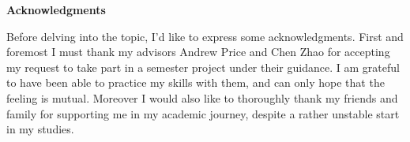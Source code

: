 \pagestyle{fancy}
\fancyhf{} %
\fancyfoot[C]{\small\thepage} %
\renewcommand{\headrulewidth}{0pt} %
\renewcommand{\footrulewidth}{0.4pt} %

\vspace*{20mm}

\begin{center}
    {\textbf{\large Acknowledgments} }
\end{center}



\noindent Before delving into the topic, I'd like to express some acknowledgments. First and foremost I must thank my advisors Andrew Price and Chen Zhao for accepting my request to take part in a semester project under their guidance. I am grateful to have been able to practice my skills with them, and can only hope that the feeling is mutual. Moreover I would also like to thoroughly thank my friends and family for supporting me in my academic journey, despite a rather unstable start in my studies.

\cleardoublepage{}
